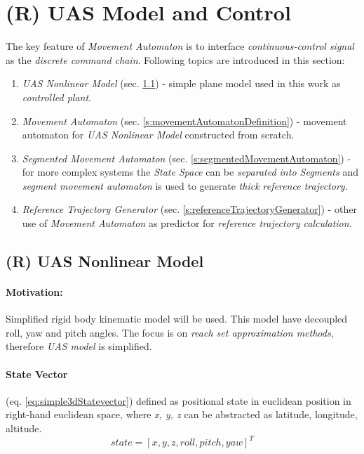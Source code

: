 \newpage
\section{(R) UAS Model and Control}\label{s:modelMAImplementation}

\noindent The key feature of \emph{Movement Automaton} is to interface \emph{continuous-control signal} as the \emph{discrete command chain}. Following topics are introduced in this section:

\begin{enumerate}
    \item \emph{UAS Nonlinear Model} (sec. \ref{s:UASNonlinearModel}) - simple plane model used in this work as \emph{controlled plant}.
    
    \item \emph{Movement Automaton} (sec. \ref{s:movementAutomatonDefinition}) - movement automaton for \emph{UAS Nonlinear Model} constructed from scratch.
    
    \item \emph{Segmented Movement Automaton} (sec. \ref{s:segmentedMovementAutomaton}) - for more complex systems the \emph{State Space} can be \emph{separated into Segments} and \emph{segment movement automaton} is used to generate \emph{thick reference trajectory}.
    
    \item \emph{Reference Trajectory Generator} (sec. \ref{s:referenceTrajectoryGenerator}) - other use of \emph{Movement Automaton} as predictor for \emph{reference trajectory calculation}.
\end{enumerate}


\subsection{(R) UAS Nonlinear Model}\label{s:UASNonlinearModel}
\paragraph{Motivation:} Simplified rigid body kinematic model will be used. This model have decoupled roll, yaw and pitch angles. The focus is on \emph{reach set approximation methods}, therefore \emph{UAS model} is simplified.

\paragraph{State Vector} (eq. \ref{eq:simple3dStatevector}) defined as positional state in euclidean position in right-hand euclidean space, where \emph{x, y, z} can be abstracted as latitude, longitude, altitude.
\begin{equation}\label{eq:simple3dStatevector}
    state = \left [ x,y,z, roll, pitch, yaw \right]^T
\end{equation}


